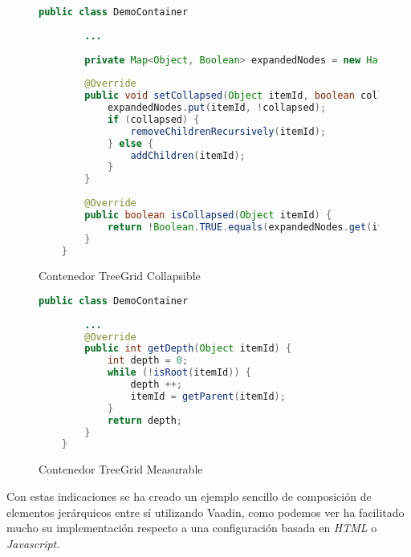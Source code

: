 \begin{figure}[!tb]
	\centering
	\begin{lstlisting}[language=Java]
	public class DemoContainer
	
		...
	
		private Map<Object, Boolean> expandedNodes = new HashMap<>();
			
		@Override
		public void setCollapsed(Object itemId, boolean collapsed) {
			expandedNodes.put(itemId, !collapsed);	
			if (collapsed) {
				removeChildrenRecursively(itemId);
			} else {
				addChildren(itemId);
			}
		}
		
		@Override
		public boolean isCollapsed(Object itemId) {
			return !Boolean.TRUE.equals(expandedNodes.get(itemId));
		}
	}\end{lstlisting}
	\caption{Contenedor TreeGrid Collapsible}
	\label{fig:demoContainerCollapsible}
\end{figure}

\begin{figure}[!tb]
	\centering
	\begin{lstlisting}[language=Java]	
	public class DemoContainer
	
		...
		@Override
		public int getDepth(Object itemId) {
			int depth = 0;
			while (!isRoot(itemId)) {
				depth ++;
				itemId = getParent(itemId);
			}
			return depth;
		}
	}\end{lstlisting}
	\caption{Contenedor TreeGrid Measurable}
	\label{fig:demoContainerMeasurable}
\end{figure}


Con estas indicaciones se ha creado un ejemplo sencillo de composición de elementos jerárquicos entre sí utilizando Vaadin, como podemos ver ha facilitado mucho su implementación respecto a una configuración basada en \emph{HTML} o \emph{Javascript}.

